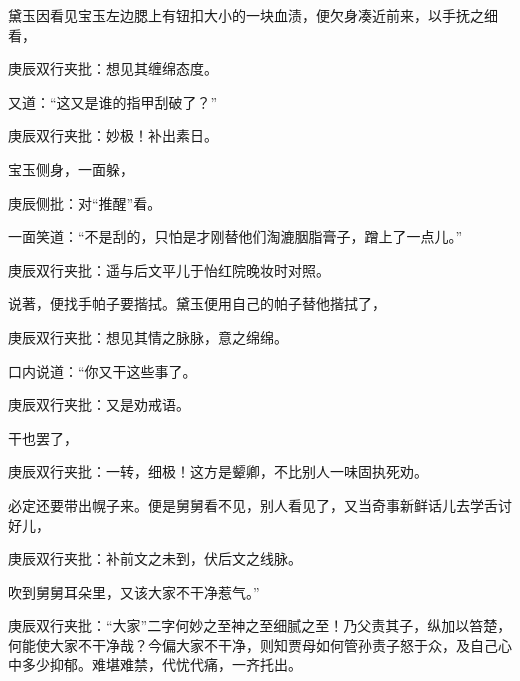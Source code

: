 \begin{parag}


    黛玉因看见宝玉左边腮上有钮扣大小的一块血渍，便欠身凑近前来，以手抚之细看，\begin{note}庚辰双行夹批：想见其缠绵态度。\end{note}又道：“这又是谁的指甲刮破了？”\begin{note}庚辰双行夹批：妙极！补出素日。\end{note}宝玉侧身，一面躲，\begin{note}庚辰侧批：对“推醒”看。\end{note}一面笑道：“不是刮的，只怕是才刚替他们淘漉胭脂膏子，蹭上了一点儿。”\begin{note}庚辰双行夹批：遥与后文平儿于怡红院晚妆时对照。\end{note}说著，便找手帕子要揩拭。黛玉便用自己的帕子替他揩拭了，\begin{note}庚辰双行夹批：想见其情之脉脉，意之绵绵。\end{note}口内说道：“你又干这些事了。\begin{note}庚辰双行夹批：又是劝戒语。\end{note}干也罢了，\begin{note}庚辰双行夹批：一转，细极！这方是颦卿，不比别人一味固执死劝。\end{note}必定还要带出幌子来。便是舅舅看不见，别人看见了，又当奇事新鲜话儿去学舌讨好儿，\begin{note}庚辰双行夹批：补前文之未到，伏后文之线脉。\end{note}吹到舅舅耳朵里，又该大家不干净惹气。”\begin{note}庚辰双行夹批：“大家”二字何妙之至神之至细腻之至！乃父责其子，纵加以笞楚，何能使大家不干净哉？今偏大家不干净，则知贾母如何管孙责子怒于众，及自己心中多少抑郁。难堪难禁，代忧代痛，一齐托出。\end{note}
\end{parag}


